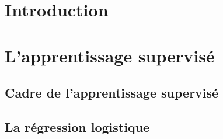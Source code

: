 \documentclass[10pt]{beamer}
\begin{document}
\section*{Introduction}

\section*{L'apprentissage supervisé}


\subsection*{Cadre de l'apprentissage supervisé}

\subsection*{La régression logistique}



%
%		
%		
%		
%		
%		
\end{document}
